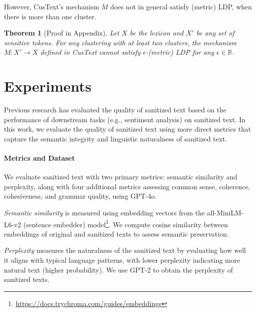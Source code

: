 \documentclass[11pt]{article}
\newtheorem{theorem}{Theorem}
\begin{document}
However, CusText's mechanism $M$ does not in general satisfy (metric) LDP, when there is more than one cluster.

\begin{theorem}[Proof in Appendix] \label{custext_priv}
Let $X$ be the lexicon and $X'$ be any set of sensitive tokens. For any clustering with at least two clusters, the mechanism $M:X' \rightarrow X$ defined in CusText cannot satisfy $\epsilon$-(metric) LDP for any $\epsilon\in \mathbb{R}$.
\end{theorem}


















\section{Experiments}
\label{sec:experiments}


Previous research \citep{feyisetan2020privacy, yue2021differential, chen2023customized} has evaluated the quality of sanitized text based on the performance of downstream tasks (e.g., sentiment analysis) on sanitized text. 
In this work, we evaluate the quality of sanitized text using more direct metrics that capture the semantic integrity and linguistic naturalness of sanitized text.

\paragraph{Metrics and Dataset}
We evaluate sanitized text with two primary metrics: semantic similarity and perplexity, along with four additional metrics assessing common sense, coherence, cohesiveness, and grammar quality, using GPT-4o.

\textit{Semantic similarity} is measured using embedding vectors from the all-MiniLM-L6-v2 (sentence embedder) model\footnote{\url{https://docs.trychroma.com/guides/embeddings}}. 
We compute cosine similarity between embeddings of original and sanitized texts to assess semantic preservation.

\textit{Perplexity} measures the naturalness of the sanitized text by evaluating how well it aligns with typical language patterns, with lower perplexity indicating more natural text (higher probability). We use GPT-2 to obtain the perplexity of sanitized texts.
\end{document}
